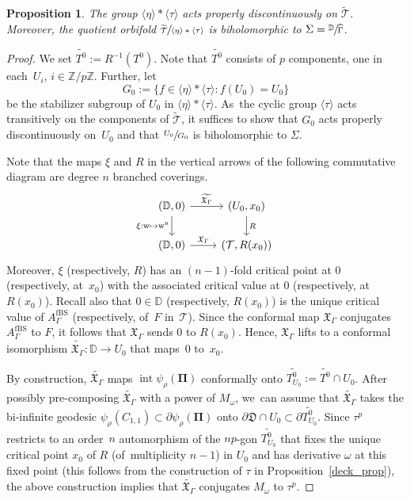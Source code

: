\documentclass[JEP,XML,SOM,Unicode,NoFloatCountersInSection,published]{cedram}
\def\mto{\mathchoice{\longmapsto}{\mapsto}{\mapsto}{\mapsto}}
\let\faktor\sfrac
\newtheorem{proposition}[lemma]{Proposition}
\theoremstyle{definition}
\theoremstyle{remark}
\newcommand{\D}{\mathbb{D}}
\newcommand{\Z}{\mathbb{Z}}
\newcommand{\cT}{\mathcal{T}}
\DeclareMathOperator{\Int}{int}
\begin{document}
\begin{proposition}\label{lifted_tiling_quotient_prop}
The group $\langle\eta\rangle\ast\langle\tau\rangle$ acts properly discontinuously on $\widetilde{\cT}$. Moreover, the quotient orbifold $\faktor{\widetilde{\cT}}{\langle\eta\rangle\ast\langle\tau\rangle}$ is biholomorphic to $\Sigma=\faktor{\D}{\widehat{\Gamma}}$.
\end{proposition}
\begin{proof}
We set $\widetilde{T^0}:=R^{-1}(T^0)$.
Note that $\widetilde{T^0}$ consists of $p$ components, one in each~$U_i$, $i\in\Z/p\Z$.
Further, let
\[
G_0:=\{f\in\langle\eta\rangle\ast\langle\tau\rangle: f(U_0)=U_0\}
\]
be the stabilizer subgroup of $U_0$ in $\langle\eta\rangle\ast\langle\tau\rangle$. As~the cyclic group $\langle\tau\rangle$ acts transitively on the components of $\widetilde{\cT}$, it suffices to show that $G_0$ acts properly discontinuously on~$U_0$ and that $\faktor{U_0}{G_0}$ is biholomorphic to $\Sigma$.

Note that the maps $\xi$ and $R$ in the vertical arrows of the following commutative diagram are degree $n$ branched coverings.
\[
\begin{tikzcd}
\left(\D,0\right) \arrow{d}[swap]{\mathrm{\xi:w\mto w^n}} \arrow{r}{\widetilde{\mathfrak{X}_\Gamma}} & \left(U_0,x_0\right) \arrow{d}{R} \\
\left(\D,0\right) \arrow{r}{\mathfrak{X}_{\Gamma}} & \left(\cT,R(x_0)\right)
\end{tikzcd}
\]
Moreover, $\xi$ (respectively, $R$) has an $(n-1)$-fold critical point at $0$ (respectively, at~$x_0$) with the associated critical value at $0$ (respectively, at~$R(x_0)$). Recall also that $0\in\D$ (respectively, $R(x_0)$) is the unique critical value of $A_{\Gamma}^{\mathrm{fBS}}$ (respectively, of~$F$ in~$\cT$). Since the conformal map $\mathfrak{X}_{\Gamma}$ conjugates $A_{\Gamma}^{\mathrm{fBS}}$ to $F$, it follows that $\mathfrak{X}_{\Gamma}$ sends $0$ to $R(x_0)$. Hence, $\mathfrak{X}_{\Gamma}$ lifts to a conformal isomorphism $\widetilde{\mathfrak{X}_\Gamma}:\D\to U_0$ that maps~$0$ to~$x_0$.

By construction, $\widetilde{\mathfrak{X}_\Gamma}$ maps $\Int{\psi_\rho(\pmb{\Pi})}$ conformally onto $\widetilde{T^0_{U_0}}:=\widetilde{T^0}\cap U_0$. After possibly pre-composing $\widetilde{\mathfrak{X}_\Gamma}$ with a power of $M_\omega$, we~can assume that $\widetilde{\mathfrak{X}_\Gamma}$ takes the bi-infinite geodesic $\psi_\rho(C_{1,1})\subset \partial\psi_\rho(\pmb{\Pi})$ onto $\partial\mathfrak{D}\cap U_0 \subset\partial\widetilde{T^0_{U_0}}$. Since $\tau^p$ restricts to an order~$n$ automorphism of the $np$-gon $\widetilde{T^0_{U_0}}$ that fixes the unique critical point $x_0$ of $R$ (of~multiplicity $n-1$) in $U_0$ and has derivative $\omega$ at this fixed point (this follows from the construction of $\tau$ in Proposition~\ref{deck_prop}), the above construction implies that $\widetilde{\mathfrak{X}_\Gamma}$ conjugates $M_\omega$ to $\tau^p$.


\end{proof}
\end{document}
